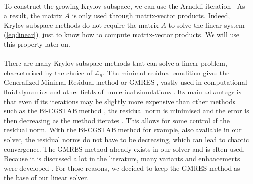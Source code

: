       \paragraph{}
      To construct the growing Krylov subspace, we can use the Arnoldi iteration \cite{TrefethenBau1997}.
      As a result, the matrix $A$ is only used through matrix-vector products.
      Indeed, Krylov subspace methods do not require the matrix $A$ to solve the linear system (\ref{eq:linear}), just to know how to compute matrix-vector products.
      We will use this property later on.

      \paragraph{}
      There are many Krylov subspace methods that can solve a linear problem, characterised by the choice of $\mathcal{L}_n$.
      The minimal residual condition gives the Generalized Minimal Residual method or GMRES \cite{SaadSchultz1986}, vastly used in computational fluid dynamics \cite{FrancoCamierAndrejEtAl2020} and other fields of numerical simulations \cite{ErnstGander2012, Mercier2015}.
      Its main advantage is that even if its iterations may be slightly more expensive than other methods such as the Bi-CGSTAB method \cite{Vorst1992, TrefethenBau1997}, the residual norm is minimised and the error is then decreasing as the method iterates .
      This allows for some control of the residual norm.
      With the Bi-CGSTAB method for example, also available in our solver, the residual norms do not have to be decreasing, which can lead to chaotic convergence.
      The GMRES method already exists in our solver and is often used.
      Because it is discussed a lot in the literature, many variants and enhancements were developed \cite{CoulaudGiraudRametEtAl2013, Vasseur2016, JolivetTournier2016}.
      For those reasons, we decided to keep the GMRES method as the base of our linear solver.

